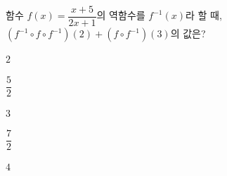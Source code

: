 \hspace*{2mm}\begin{minipage}[t]{\dimexpr\linewidth-2mm\relax}\vspace{0pt}
함수 $f(x)=\dfrac{x+5}{2x+1}$의 역함수를 $f^{-1}(x)$라 할 때, $(f^{-1}\circ f\circ f^{-1})(2)+(f\circ f^{-1})(3)$의 값은?
\begin{choices32}{\rule[-3ex]{0pt}{8ex}$2$}{\rule[-3ex]{0pt}{8ex}$\dfrac{5}{2}$}{\rule[-3ex]{0pt}{8ex}$3$}{\rule[-3ex]{0pt}{8ex}$\dfrac{7}{2}$}{\rule[-3ex]{0pt}{8ex}$4$}\end{choices32}\end{minipage}
